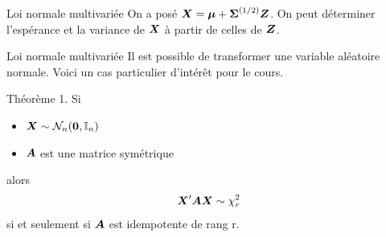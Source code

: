 \documentclass{BeamerAAV}
\begin{document}
\begin{frame}{Loi normale multivariée}
On a posé $\boX=\bo\mu + \bo\Sigma^{(1/2)}\bo{Z}$. 
On peut déterminer l'espérance et la variance de $\boX$ à partir de celles de $\bo{Z}$.
\vspace{6cm}
\end{frame}

\begin{frame}{Loi normale multivariée}
Il est possible de transformer une variable aléatoire normale. Voici un cas particulier d'intérêt pour le cours.

\begin{bte}{Théorème 1.}
Si 
\begin{itemize}
    \item[-] $\boX \sim \N_n(\bo 0,\boI_n)$
    \item[-]  $\bo A$ est une matrice symétrique
\end{itemize}
alors 
$$\boX'\bo A\boX \sim \chi^2_r$$
si et seulement si $\bo A$ est idempotente de rang r.
\end{bte}
\end{frame}
\end{document}
